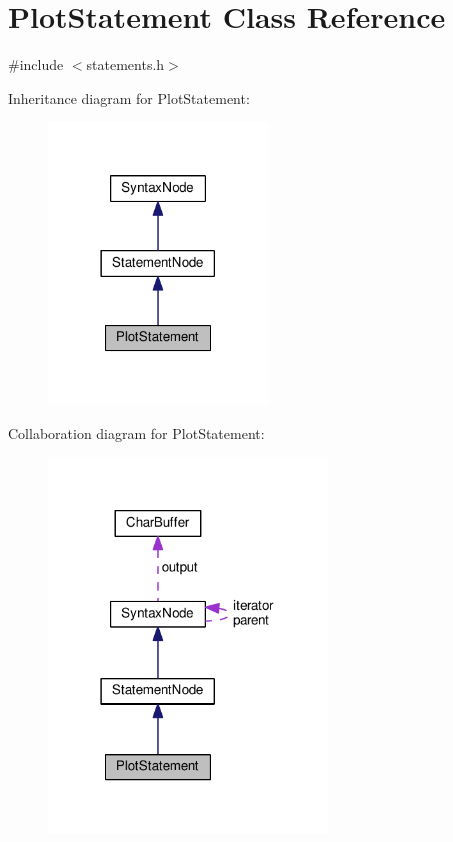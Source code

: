 \hypertarget{classPlotStatement}{}\section{Plot\+Statement Class Reference}
\label{classPlotStatement}


{\ttfamily \#include $<$statements.\+h$>$}



Inheritance diagram for Plot\+Statement\+:\nopagebreak
\begin{figure}[H]
\begin{center}
\leavevmode
\includegraphics[width=165pt]{classPlotStatement__inherit__graph}
\end{center}
\end{figure}


Collaboration diagram for Plot\+Statement\+:\nopagebreak
\begin{figure}[H]
\begin{center}
\leavevmode
\includegraphics[width=210pt]{classPlotStatement__coll__graph}
\end{center}
\end{figure}
